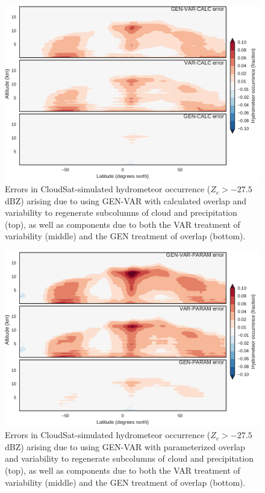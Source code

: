 \begin{figure}
\centering
\includegraphics[width=\columnwidth]{graphics/subgrid2_hfba_zonal_gen-var-calc_diff.pdf}
\caption{Errors in CloudSat-simulated hydrometeor occurrence ($Z_e > -27.5$ dBZ) arising due to using GEN-VAR with calculated overlap and variability to regenerate subcolumns of cloud and precipitation (top), as well as components due to both the VAR treatment of variability (middle) and the GEN treatment of overlap (bottom).}
\label{subgrid2_hfba_zonal_diff}
\end{figure}

\begin{figure}
\centering
\includegraphics[width=\columnwidth]{graphics/subgrid2_hfba_zonal_gen-var-param_diff.pdf}
\caption{Errors in CloudSat-simulated hydrometeor occurrence ($Z_e > -27.5$ dBZ) arising due to using GEN-VAR with parameterized overlap and variability to regenerate subcolumns of cloud and precipitation (top), as well as components due to both the VAR treatment of variability (middle) and the GEN treatment of overlap (bottom).}
\label{subgrid2_hfba_zonal_gen-var-param_diff}
\end{figure}

